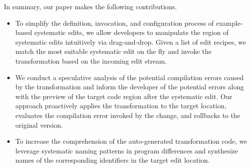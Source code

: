 In summary, our paper makes the following contributions. 
\begin{itemize}
  \item  To simplify the  definition, invocation, and configuration process of example-based systematic edits, we allow developers to manipulate the region of systematic edits intuitively via drag-and-drop. %
Given a list of edit recipes, we match the most suitable systematic edit on the fly and invoke the transformation based on the incoming edit stream. 


  \item  We conduct a speculative analysis of the potential compilation errors caused by the transformation and inform the developer of the potential errors along with the preview of the target code region after the systematic edit.  Our approach proactively applies the transformation to the target location, evaluates the compilation error invoked by the change, and rollbacks to the original version. 
  
  \item To increase the comprehension of the auto-generated transformation code, we leverage systematic naming patterns in program differences and synthesize names of the corresponding identifiers in the target edit location.
\end{itemize}

